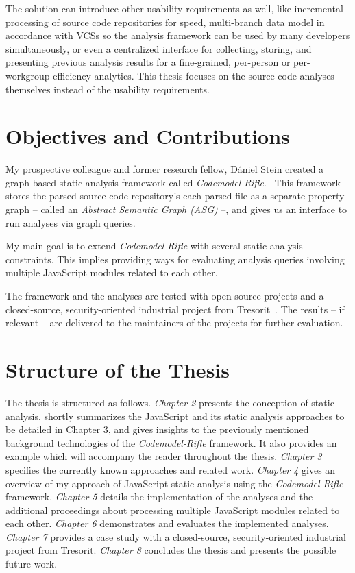 The solution can introduce other usability requirements as well, like incremental processing of source code repositories for speed, multi-branch data model in accordance with VCSs so the analysis framework can be used by many developers simultaneously, or even a centralized interface for collecting, storing, and presenting previous analysis results for a fine-grained, per-person or per-workgroup efficiency analytics. This thesis focuses on the source code analyses themselves instead of the usability requirements.


\section{Objectives and Contributions}

My prospective colleague and former research fellow, Dániel Stein created a graph-based static analysis framework called \emph{Codemodel-Rifle}.~\cite{stein-daniel-msc} This framework stores the parsed source code repository's each parsed file as a separate property graph – called an \emph{Abstract Semantic Graph (ASG)} –, and gives us an interface to run analyses via graph queries.

My main goal is to extend \emph{Codemodel-Rifle} with several static analysis constraints. This implies providing ways for evaluating analysis queries involving multiple JavaScript modules related to each other.

The framework and the analyses are tested with open-source projects and a closed-source, security-oriented industrial project from Tresorit~\cite{tresorit}. The results – if relevant – are delivered to the maintainers of the projects for further evaluation.


\section{Structure of the Thesis}

The thesis is structured as follows. \emph{Chapter 2} presents the conception of static analysis, shortly summarizes the JavaScript and its static analysis approaches to be detailed in Chapter 3, and gives insights to the previously mentioned background technologies of the \emph{Codemodel-Rifle} framework. It also provides an example which will accompany the reader throughout the thesis. \emph{Chapter 3} specifies the currently known approaches and related work. \emph{Chapter 4} gives an overview of my approach of JavaScript static analysis using the \emph{Codemodel-Rifle} framework. \emph{Chapter 5} details the implementation of the analyses and the additional proceedings about processing multiple JavaScript modules related to each other. \emph{Chapter 6} demonstrates and evaluates the implemented analyses. \emph{Chapter 7} provides a case study with a closed-source, security-oriented industrial project from Tresorit. \emph{Chapter 8} concludes the thesis and presents the possible future work.

